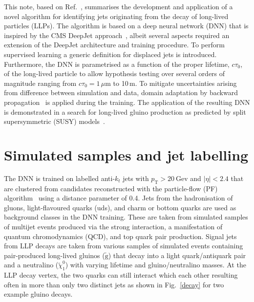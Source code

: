 \documentclass{webofc}
\newcommand{\tauo}{\ensuremath{c\tau_{0}}\xspace}
\newcommand{\ctau}{\ensuremath{c\tau_{0}}\xspace}
\newcommand{\gluino}{\ensuremath{\tilde{\textrm{g}}}\xspace}
\newcommand{\lsp}{\ensuremath{\tilde{\chi}_{1}^{0}}\xspace}
\newcommand{\pt}{\ensuremath{p_\textrm{T}}\xspace}
\begin{document}
This note, based on Ref.~\cite{CMS-EXO-19-011}, summarises the development and application of a novel algorithm for identifying jets originating from the decay of long-lived particles (LLPs). The algorithm is based on a deep neural network (DNN) that is inspired by the CMS DeepJet approach~\cite{dj}, albeit several aspects required an extension of the DeepJet architecture and training procedure. To perform supervised learning a generic definition for displaced jets is introduced. Furthermore, the DNN is parametrised as a function of the proper lifetime, \tauo, of the long-lived particle to allow hypothesis testing over several orders of magnitude ranging from $\ctau = 1\,\mu\textrm{m}$ to 10\,m. To mitigate uncertainties arising from difference between simulation and data, domain adaptation by backward propagation~\cite{da} is applied during the training. The application of the resulting DNN is demonstrated in a search for long-lived gluino production as predicted by split supersymmetric (SUSY) models~\cite{splitsusy}.

\section{Simulated samples and jet labelling}
\label{samples}

The DNN is trained on labelled anti-$k_t$ jets with $\pt>20~\mathrm{Gev}$ and $|\eta|<2.4$ that are clustered from candidates reconstructed with the particle-flow (PF) algorithm~\cite{pf} using a distance parameter of 0.4. Jets from the hadronisation of gluons, light-flavoured quarks (uds), and charm or bottom quarks are used as background classes in the DNN training. These are taken from simulated samples of multijet events produced via the strong interaction, a manifestation of quantum chromodynamics (QCD), and top quark pair production. Signal jets from LLP decays are taken from various samples of simulated events containing pair-produced long-lived gluinos (\gluino) that decay into a light quark/antiquark pair and a neutralino (\lsp) with varying lifetime and gluino/neutralino masses. At the LLP decay vertex, the two quarks can still interact which each other resulting often in more than only two distinct jets as shown in Fig.~\ref{decay} for two example gluino decays.
\end{document}
